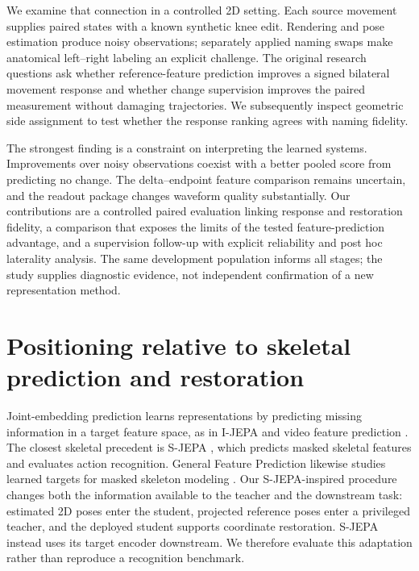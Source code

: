 \documentclass{article}
\begin{document}
We examine that connection in a controlled 2D setting. Each source movement supplies paired states with a known synthetic knee edit. Rendering and pose estimation produce noisy observations; separately applied naming swaps make anatomical left--right labeling an explicit challenge. The original research questions ask whether reference-feature prediction improves a signed bilateral movement response and whether change supervision improves the paired measurement without damaging trajectories. We subsequently inspect geometric side assignment to test whether the response ranking agrees with naming fidelity.

The strongest finding is a constraint on interpreting the learned systems. Improvements over noisy observations coexist with a better pooled score from predicting no change. The delta--endpoint feature comparison remains uncertain, and the readout package changes waveform quality substantially. Our contributions are a controlled paired evaluation linking response and restoration fidelity, a comparison that exposes the limits of the tested feature-prediction advantage, and a supervision follow-up with explicit reliability and post hoc laterality analysis. The same development population informs all stages; the study supplies diagnostic evidence, not independent confirmation of a new representation method.

\section{Positioning relative to skeletal prediction and restoration}
Joint-embedding prediction learns representations by predicting missing information in a target feature space, as in I-JEPA and video feature prediction \citep{assran2023ijepa,bardes2024vjepa}. The closest skeletal precedent is S-JEPA \citep{abdelfattah2024sjepa}, which predicts masked skeletal features and evaluates action recognition. General Feature Prediction likewise studies learned targets for masked skeleton modeling \citep{sun2025gfp}. Our S-JEPA-inspired procedure changes both the information available to the teacher and the downstream task: estimated 2D poses enter the student, projected reference poses enter a privileged teacher, and the deployed student supports coordinate restoration. S-JEPA instead uses its target encoder downstream. We therefore evaluate this adaptation rather than reproduce a recognition benchmark.
\end{document}
